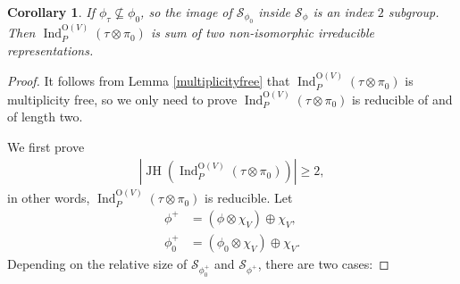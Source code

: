 \documentclass[article]{article}
\numberwithin{equation}{section}
\newtheorem{corollary}[theorem]{Corollary}
\theoremstyle{definition}
\DeclareMathOperator{\Ind}{Ind}
\DeclareMathOperator{\JH}{JH}
\begin{document}
\begin{corollary}\label{notanisomorphism}
	If $\phi_\tau\not \subseteq \phi_0$, so the image of $\mathcal S_{\phi_{0}}$ inside $\mathcal {S}_{\phi}$ is an index $2$ subgroup. Then $\Ind_{P}^{\mathrm O(V)}(\tau\otimes \pi_0)$ is sum of two non-isomorphic irreducible representations. 
\end{corollary}
\begin{proof}
	It follows from Lemma \ref{multiplicityfree} that $\Ind_{P}^{\mathrm O(V)}(\tau\otimes \pi_0)$ is multiplicity free, so we only need to prove $\Ind_{P}^{\mathrm O(V)}(\tau\otimes \pi_0)$ is reducible of and of length two.  
	
	We first prove 
	\begin{align}\label{1236}
	\left|\JH(\Ind_{P}^{\mathrm O(V)}(\tau\otimes \pi_0))\right|\geq 2,
	\end{align}
	in other words, $\Ind_{P}^{\mathrm O(V)}(\tau\otimes \pi_0)$ is reducible. Let  
	\begin{align*}
	\phi^+&=(\phi\otimes \chi_{V})\oplus \chi_{V}, \\
	\phi^+_{0}&=(\phi_{0}\otimes\chi_{V})\oplus \chi_{V}.
	\end{align*}
	Depending on the relative size of $\mathcal S_{\phi^+_{0}}$ and $\mathcal S_{\phi^+}$, there are two cases: 
	

\end{proof}
\end{document}
